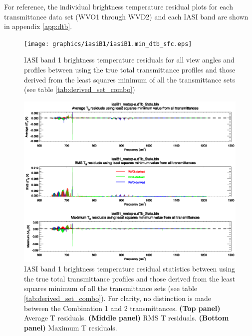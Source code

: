 For reference, the individual brightness temperature residual plots for each transmittance data set (WVO1 through WVD2) and each IASI band are shown in appendix \ref{app:dtb}.
\begin{figure}[htp]
  \centering
  \texttt{[image: graphics/iasiB1/iasiB1.min\_dtb\_sfc.eps]}
  \caption{IASI band 1 brightness temperature residuals for all view angles and profiles between using the true total transmittance profiles and those derived from the least squares minimum of all the transmittance sets (see table \ref{tab:derived_set_combo})}
  \label{fig:iasiB1.min_dtb_sfc}
  \vspace{1em}
  \includegraphics[scale=0.8]{graphics/iasiB1/iasiB1.min_dtb.eps}
  \caption{IASI band 1 brightness temperature residual statistics between using the true total transmittance profiles and those derived from the least squares minimum of all the transmittance sets (see table \ref{tab:derived_set_combo}). For clarity, no distinction is made between the Combination 1 and 2 transmittances. \textbf{(Top panel)} Average T residuals. \textbf{(Middle panel)} RMS T residuals. \textbf{(Bottom panel)} Maximum T residuals.}
  \label{fig:iasiB1.min_dtb}
\end{figure}
